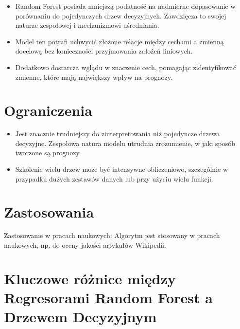 \begin{itemize}

\item Random Forest posiada mniejszą podatność na nadmierne dopasowanie w porównaniu do pojedynczych drzew decyzyjnych. Zawdzięcza to swojej naturze zespołowej i mechanizmowi uśredniania. 

\item Model ten potrafi uchwycić złożone relacje między cechami a zmienną docelową bez konieczności przyjmowania założeń liniowych.

\item Dodatkowo dostarcza wglądu w znaczenie cech, pomagając zidentyfikować zmienne, które mają największy wpływ na prognozy.

\end{itemize}

{}
\section*{Ograniczenia }
\vspace{-1.0em}

\begin{itemize}

\item Jest znacznie trudniejszy do zinterpretowania niż pojedyncze drzewa decyzyjne. Zespołowa natura modelu utrudnia zrozumienie, w jaki sposób tworzone są prognozy. 

\item Szkolenie wielu drzew może być intensywne obliczeniowo, szczególnie w przypadku dużych zestawów danych lub przy użyciu wielu funkcji.
\end{itemize}

{}
\section*{Zastosowania \cite{lewoniewski2016quality, wecel2015modelling}}
\vspace{-1.0em}

\hspace{1.5cm} Zastosowanie w pracach naukowych: Algorytm jest stosowany w pracach naukowych, np. do oceny jakości artykułów Wikipedii.

{}
\section*{Kluczowe różnice między Regresorami Random Forest a Drzewem Decyzyjnym}
\vspace{-1.0em}

